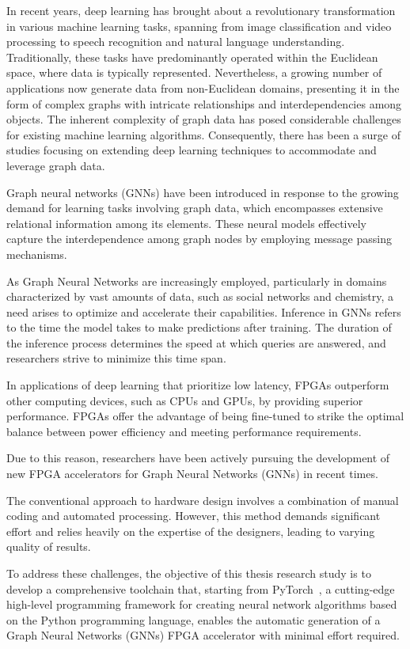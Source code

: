 In recent years, deep learning has brought about a revolutionary transformation in various machine learning tasks,
spanning from image classification and video processing to speech recognition and natural language understanding.
Traditionally, these tasks have predominantly operated within the Euclidean space, where data is typically
represented.
Nevertheless, a growing number of applications now generate data from non-Euclidean domains,
presenting it in the form of complex graphs with intricate relationships and interdependencies among objects.
The inherent complexity of graph data has posed considerable challenges for existing machine learning algorithms.
Consequently, there has been a surge of studies focusing on extending deep learning techniques to accommodate
and leverage graph data.

Graph neural networks (GNNs) have been introduced in response to the growing demand for learning tasks involving
graph data, which encompasses extensive relational information among its elements.
These neural models effectively capture the interdependence among graph nodes by employing message passing mechanisms.

As Graph Neural Networks are increasingly employed, particularly in domains characterized by vast amounts of data,
such as social networks and chemistry, a need arises to optimize and accelerate their capabilities.
Inference in GNNs refers to the time the model takes to make predictions after training.
The duration of the inference process determines the speed at which queries are answered, and researchers strive to minimize this time span.

In applications of deep learning that prioritize low latency, FPGAs outperform other computing devices, such as CPUs and GPUs,
by providing superior performance.
FPGAs offer the advantage of being fine-tuned to strike the optimal balance between power efficiency and meeting performance requirements.

Due to this reason, researchers have been actively pursuing the development of new FPGA accelerators for Graph Neural Networks (GNNs) in recent times.

The conventional approach to hardware design involves a combination of manual coding and automated processing.
However, this method demands significant effort and relies heavily on the expertise of the designers, leading to varying quality of results.

To address these challenges, the objective of this thesis research study is to develop a comprehensive toolchain that, starting from PyTorch~\cite{DBLP:journals/corr/abs-1912-01703},
a cutting-edge high-level programming framework for creating neural network algorithms based on the Python programming language, enables the
automatic generation of a Graph Neural Networks (GNNs) FPGA accelerator with minimal effort required.

